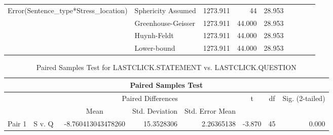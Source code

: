 \documentclass[a4paper]{article}
\begin{document}
\begin{table}[H]
\begin{center}
\begin{tabular}{p{}p{}|l|r|r|r|r|r|}
\hline
\multirow{4}{*}{Error(Sentence\_type*Stress\_location)} & Sphericity Assumed & 1273.911                                     & 44                      & 28.953                           & \multicolumn{1}{l|}{~} & \multicolumn{1}{l|}{~}     \\ 
\cline{2-7}
                                                        & Greenhouse-Geisser & 1273.911                                     & 44.000                  & 28.953                           & \multicolumn{1}{l|}{~} & \multicolumn{1}{l|}{~}     \\ 
\cline{2-7}
                                                        & Huynh-Feldt        & 1273.911                                     & 44.000                  & 28.953                           & \multicolumn{1}{l|}{~} & \multicolumn{1}{l|}{~}     \\ 
\cline{2-7}
                                                        & Lower-bound        & 1273.911                                     & 44.000                  & 28.953                           & \multicolumn{1}{l|}{~} & \multicolumn{1}{l|}{~}     \\
\hline
\end{tabular}
\end{center}
\end{table}




\begin{table}
\centering
\caption{Paired Samples Test for LASTCLICK.STATEMENT vs. LASTCLICK.QUESTION}
\label{tab:click}
\begin{tabular}{|l|l|c|c|c|c|c|c|} 
\hline
\multicolumn{8}{|c|}{Paired Samples Test}                                                                                                                                                                                   \\ 
\hline
       &         & \multicolumn{3}{c|}{Paired Differences}                                                                      & \multirow{3}{*}{t}          & \multirow{3}{*}{df}     & \multirow{3}{*}{Sig. (2-tailed)}  \\ 
\cline{1-5}
       &         & \multirow{2}{*}{Mean}                   & \multirow{2}{*}{Std. Deviation} & \multirow{2}{*}{Std. Error Mean} &                             &                         &                                   \\ 
\cline{1-2}
       &         &                                         &                                 &                                  &                             &                         &                                   \\ 
\hline
Pair 1 & S v. Q~ & \multicolumn{1}{r|}{-8.760413043478260} & \multicolumn{1}{r|}{15.3528306} & \multicolumn{1}{r|}{2.26365138}  & \multicolumn{1}{r|}{-3.870} & \multicolumn{1}{r|}{45} & \multicolumn{1}{r|}{0.000}        \\
\hline
\end{tabular}
\end{table}
\end{document}

